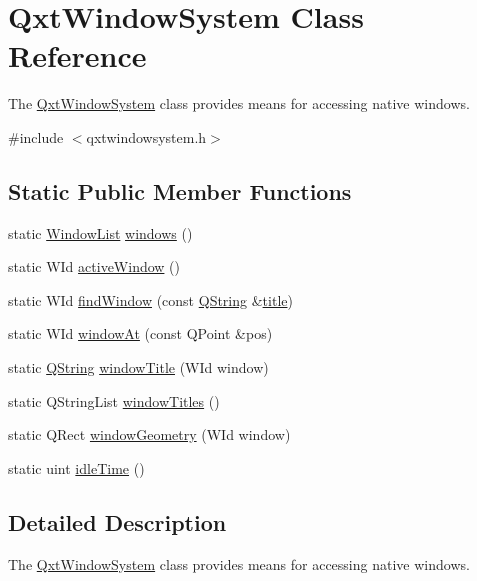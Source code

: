 \hypertarget{class_qxt_window_system}{\section{Qxt\-Window\-System Class Reference}
\label{class_qxt_window_system}
}


The \hyperlink{class_qxt_window_system}{Qxt\-Window\-System} class provides means for accessing native windows.  




{\ttfamily \#include $<$qxtwindowsystem.\-h$>$}

\subsection*{Static Public Member Functions}
\begin{DoxyCompactItemize}
\item 
static \hyperlink{qxtwindowsystem_8h_a1d6ca5ed34c654cd33594120d5b76ec5}{Window\-List} \hyperlink{class_qxt_window_system_a85949d6946e65ec035b3cabbd98760d8}{windows} ()
\item 
static W\-Id \hyperlink{class_qxt_window_system_a4a7d3cdda9eb2205c97592e528c6724d}{active\-Window} ()
\item 
static W\-Id \hyperlink{class_qxt_window_system_ad32e4d0efdbd592f0902192aedad9da6}{find\-Window} (const \hyperlink{group___u_a_v_objects_plugin_gab9d252f49c333c94a72f97ce3105a32d}{Q\-String} \&\hyperlink{_parse_e_k_f_log_8m_a5df555a5fed35967e041e4abd1269b4e}{title})
\item 
static W\-Id \hyperlink{class_qxt_window_system_a33854010bd2d0b678caf6d6277b57690}{window\-At} (const Q\-Point \&pos)
\item 
static \hyperlink{group___u_a_v_objects_plugin_gab9d252f49c333c94a72f97ce3105a32d}{Q\-String} \hyperlink{class_qxt_window_system_a539106c49b2eca630e8df41982e6728d}{window\-Title} (W\-Id window)
\item 
static Q\-String\-List \hyperlink{class_qxt_window_system_a755ec1f32d774d67a92cbe01a1a7158a}{window\-Titles} ()
\item 
static Q\-Rect \hyperlink{class_qxt_window_system_ac9554ae83f1046cf4745a70d8c4e1fca}{window\-Geometry} (W\-Id window)
\item 
static uint \hyperlink{class_qxt_window_system_ab58261f49fd45a7363d1abd7dfea831f}{idle\-Time} ()
\end{DoxyCompactItemize}


\subsection{Detailed Description}
The \hyperlink{class_qxt_window_system}{Qxt\-Window\-System} class provides means for accessing native windows. 


